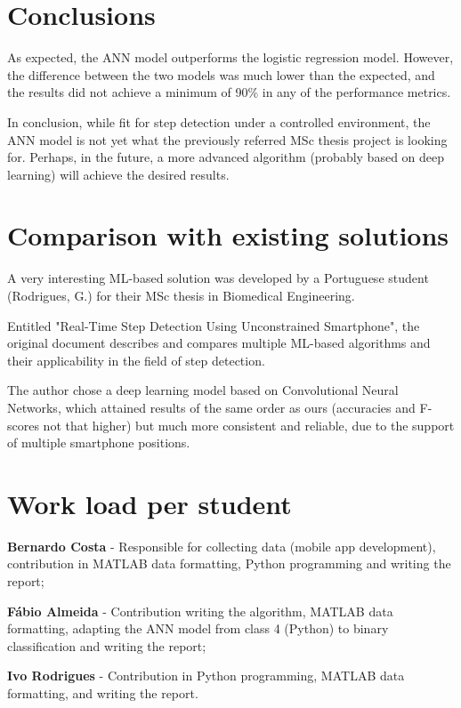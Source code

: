 \documentclass[conference]{IEEEtran}
\begin{document}
\section{Conclusions}
As expected, the ANN model outperforms the logistic regression model. However, the difference between the two models was much lower than the expected, and the results did not achieve a minimum of 90\% in any of the performance metrics.
\par In conclusion, while fit for step detection under a controlled environment, the ANN model is not yet what the previously referred MSc thesis project is looking for. Perhaps, in the future, a more advanced algorithm (probably based on deep learning) will achieve the desired results.

\section{Comparison with existing solutions}
A very interesting ML-based solution was developed by a Portuguese student (Rodrigues, G.) for their MSc thesis in Biomedical Engineering. \cite{b1}
\par Entitled "Real-Time Step Detection Using Unconstrained Smartphone", the original document describes and compares multiple ML-based algorithms and their applicability in the field of step detection. 
\par The author chose a deep learning model based on Convolutional Neural Networks, which attained results of the same order as ours (accuracies and F-scores not that higher) but much more consistent and reliable, due to the support of multiple smartphone positions.

\section{Work load per student}
\textbf{Bernardo Costa} - Responsible for collecting data (mobile app development), contribution in MATLAB data formatting, Python programming and writing the report; \par
\textbf{Fábio Almeida} - Contribution writing the algorithm, MATLAB data formatting, adapting the ANN model from class 4 (Python) to binary classification and writing the report; \par
\textbf{Ivo Rodrigues} - Contribution in Python programming, MATLAB data formatting, and writing the report.
\end{document}
